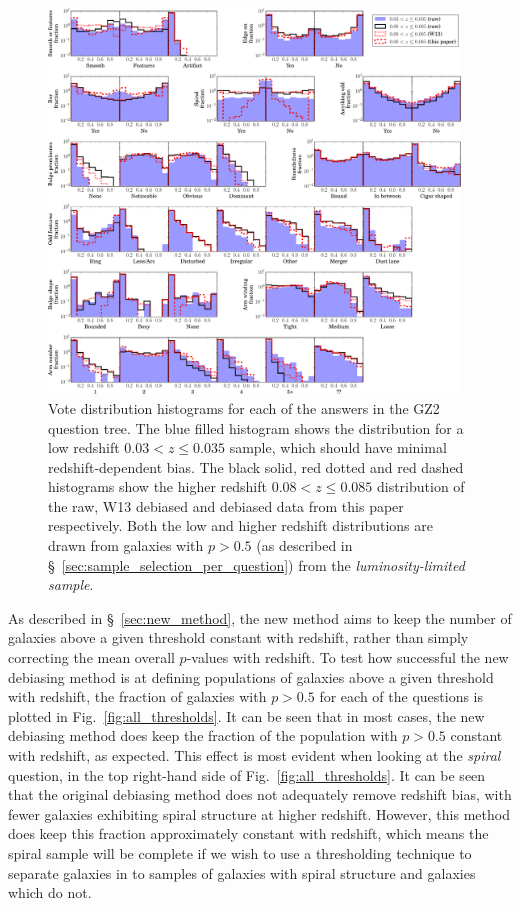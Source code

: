 \documentclass[useAMS,usenatbib]{mn2e}
\begin{document}
\begin{figure}
		\centering

        \includegraphics[width=0.975\textwidth]{Images/Bias/Debiasing/all_histograms.pdf}

        \caption{Vote distribution histograms for each of the answers in the GZ2 question tree. The blue filled histogram shows the distribution for a low redshift $0.03< z \leq 0.035$ sample, which should have minimal redshift-dependent bias. The black solid, red dotted and red dashed histograms show the higher redshift $0.08 < z \leq 0.085$ distribution of the raw, W13 debiased and debiased data from this paper respectively. Both the low and higher redshift distributions are drawn from galaxies with $p>0.5$ (as described in \S~\ref{sec:sample_selection_per_question}) from the \textit{luminosity-limited sample}.}

        \label{fig:all_histograms}

\end{figure}

As described in \S~\ref{sec:new_method}, the new method aims to keep the number of galaxies above a given threshold constant with redshift, rather than simply correcting the mean overall $p$-values with redshift. To test how successful the new debiasing method is at defining populations of galaxies above a given threshold with redshift, the fraction of galaxies with $p>0.5$ for each of the questions is plotted in Fig.~\ref{fig:all_thresholds}. It can be seen that in most cases, the new debiasing method does keep the fraction of the population with $p>0.5$ constant with redshift, as expected. This effect is most evident when looking at the \textit{spiral} question, in the top right-hand side of Fig.~\ref{fig:all_thresholds}. It can be seen that the original debiasing method does not adequately remove redshift bias, with fewer galaxies exhibiting spiral structure at higher redshift. However, this method does keep this fraction approximately constant with redshift, which means the spiral sample will be complete if we wish to use a thresholding technique to separate galaxies in to samples of galaxies with spiral structure and galaxies which do not. 
\end{document}
